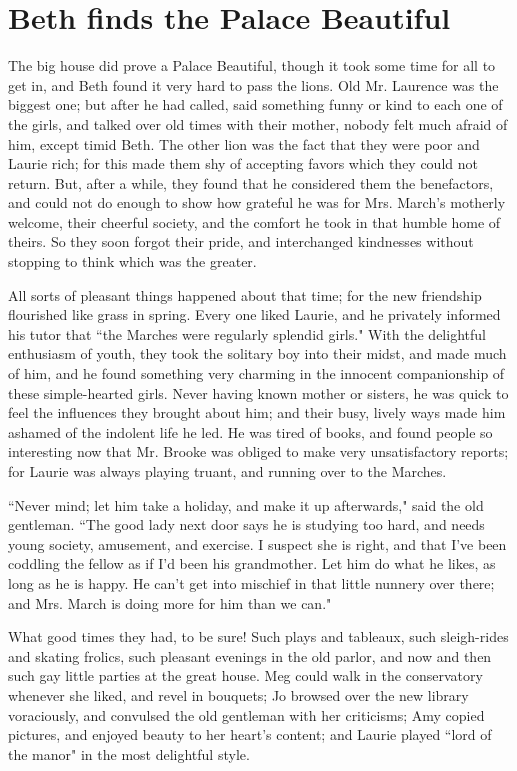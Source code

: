 \chapter{Beth finds the Palace Beautiful}

{The} big house did prove a Palace Beautiful, though it took some time
for all to get in, and Beth found it very hard to pass the lions. Old
Mr. Laurence was the biggest one; but after he had called, said
something funny or kind to each one of the girls, and talked over old
times with their mother, nobody felt much afraid of him, except timid
Beth. The other lion was the fact that they were poor and Laurie rich;
for this made them shy of accepting favors which they could not return.
But, after a while, they found that he considered them the benefactors,
and could not do enough to show how grateful he was for Mrs.
March's motherly welcome, their cheerful society, and
the comfort he took in that humble home of theirs. So they soon forgot
their pride, and interchanged kindnesses without stopping to think which
was the greater.

All sorts of pleasant things happened about that time; for the new
friendship flourished like grass in spring. Every one liked Laurie, and
he privately informed his tutor that ``the Marches were regularly
splendid girls." With the delightful enthusiasm of youth, they took the
solitary boy into their midst, and made much of him, and he found
something very charming in the innocent companionship of these
simple-hearted girls. Never having known mother or sisters, he was quick
to feel the influences they brought about him; and their busy, lively
ways made him ashamed of the indolent life he led. He was tired of
books, and found people so interesting now that Mr. Brooke was obliged
to make very unsatisfactory reports; for Laurie was always playing
truant, and running over to the Marches.

``Never mind; let him take a holiday, and make it up afterwards," said
the old gentleman. ``The good lady next door says he is studying too
hard, and needs young society, amusement, and exercise. I suspect she is
right, and that I've been coddling the fellow as if
I'd been his grandmother. Let him do what he likes, as
long as he is happy. He can't get into mischief in that
little nunnery over there; and Mrs. March is doing more for him than we
can."

What good times they had, to be sure! Such plays and tableaux, such
sleigh-rides and skating frolics, such pleasant evenings in the old
parlor, and now and then such gay little parties at the great house. Meg
could walk in the conservatory whenever she liked, and revel in
bouquets; Jo browsed over the new library voraciously, and convulsed the
old gentleman with her criticisms; Amy copied pictures, and enjoyed
beauty to her heart's content; and Laurie played ``lord
of the manor" in the most delightful style.

